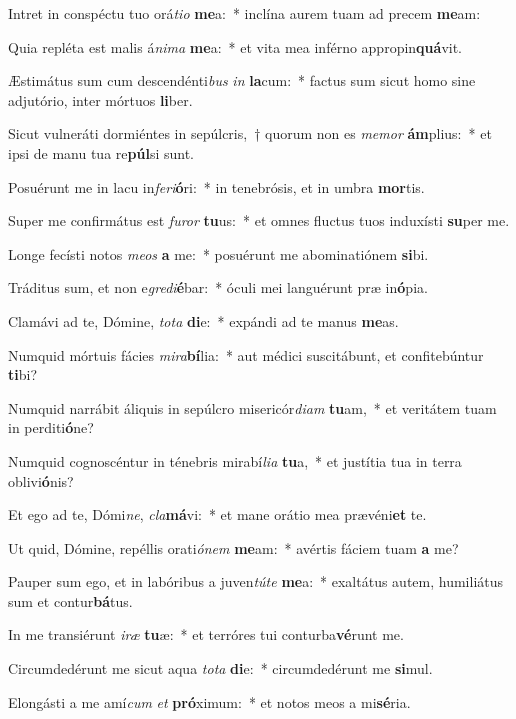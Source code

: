 \item Intret in conspéctu tuo orá\textit{ti}\textit{o} \textbf{me}a:~* inclína aurem tuam ad precem \textbf{me}am:
\item Quia repléta est malis á\textit{ni}\textit{ma} \textbf{me}a:~* et vita mea inférno appropin\textbf{quá}vit.
\item Æstimátus sum cum descendénti\textit{bus} \textit{in} \textbf{la}cum:~* factus sum sicut homo sine adjutório, inter mórtuos \textbf{li}ber.
\item Sicut vulneráti dormiéntes in sepúlcris,~† quorum non es \textit{me}\textit{mor} \textbf{ám}plius:~* et ipsi de manu tua re\textbf{púl}si sunt.
\item Posuérunt me in lacu in\textit{fe}\textit{ri}\textbf{ó}ri:~* in tenebrósis, et in umbra \textbf{mor}tis.
\item Super me confirmátus est \textit{fu}\textit{ror} \textbf{tu}us:~* et omnes fluctus tuos induxísti \textbf{su}per me.
\item Longe fecísti notos \textit{me}\textit{os} \textbf{a} me:~* posuérunt me abominatiónem \textbf{si}bi.
\item Tráditus sum, et non e\textit{gre}\textit{di}\textbf{é}bar:~* óculi mei languérunt præ in\textbf{ó}pia.
\item Clamávi ad te, Dómine, \textit{to}\textit{ta} \textbf{di}e:~* expándi ad te manus \textbf{me}as.
\item Numquid mórtuis fácies \textit{mi}\textit{ra}\textbf{bí}lia:~* aut médici suscitábunt, et confitebúntur \textbf{ti}bi?
\item Numquid narrábit áliquis in sepúlcro misericór\textit{di}\textit{am} \textbf{tu}am,~* et veritátem tuam in perditi\textbf{ó}ne?
\item Numquid cognoscéntur in ténebris mirabí\textit{li}\textit{a} \textbf{tu}a,~* et justítia tua in terra oblivi\textbf{ó}nis?
\item Et ego ad te, Dómi\textit{ne}, \textit{cla}\textbf{má}vi:~* et mane orátio mea prævéni\textbf{et} te.
\item Ut quid, Dómine, repéllis orati\textit{ó}\textit{nem} \textbf{me}am:~* avértis fáciem tuam \textbf{a} me?
\item Pauper sum ego, et in labóribus a juven\textit{tú}\textit{te} \textbf{me}a:~* exaltátus autem, humiliátus sum et contur\textbf{bá}tus.
\item In me transiérunt \textit{i}\textit{ræ} \textbf{tu}æ:~* et terróres tui conturba\textbf{vé}runt me.
\item Circumdedérunt me sicut aqua \textit{to}\textit{ta} \textbf{di}e:~* circumdedérunt me \textbf{si}mul.
\item Elongásti a me amí\textit{cum} \textit{et} \textbf{pró}ximum:~* et notos meos a mi\textbf{sé}ria.
